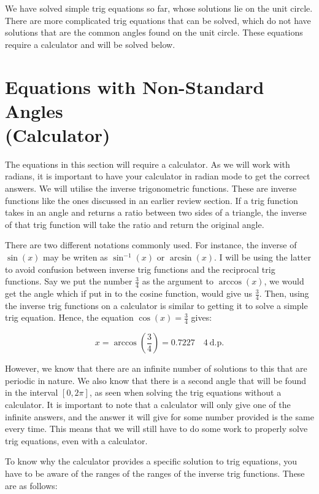 \documentclass[12pt]{article}
\theoremstyle{definition}
\begin{document}
We have solved simple trig equations so far, whose solutions lie on the unit circle.
There are more complicated trig equations that can be solved, which do not have solutions that are the common angles found on the unit circle.
These equations require a calculator and will be solved below.

\section{Equations with Non-Standard Angles \\
  (Calculator)}

The equations in this section will require a calculator.
As we will work with radians, it is important to have your calculator in radian mode to get the correct answers.
We will utilise the inverse trigonometric functions.
These are inverse functions like the ones discussed in an earlier review section.
If a trig function takes in an angle and returns a ratio between two sides of a triangle, the inverse of that trig function will take the ratio and return the original angle.

There are two different notations commonly used.
For instance, the inverse of $\sin(x)$ may be writen as $\sin^{-1}(x)$ or $\arcsin(x)$.
I will be using the latter to avoid confusion between inverse trig functions and the reciprocal trig functions.
Say we put the number $\frac{3}{4}$ as the argument to $\arccos(x)$, we would get the angle which if put in to the cosine function, would give us $\frac{3}{4}$.
Then, using the inverse trig functions on a calculator is similar to getting it to solve a simple trig equation.
Hence, the equation $\cos(x) = \frac{3}{4}$ gives:

\begin{equation}
    x = \arccos\left(\frac{3}{4}\right) = 0.7227 \quad 4~\text{d.p.}
\end{equation}

However, we know that there are an infinite number of solutions to this that are periodic in nature.
We also know that there is a second angle that will be found in the interval $[0, 2\pi]$, as seen when solving the trig equations without a calculator.
It is important to note that a calculator will only give one of the infinite answers, and the answer it will give for some number provided is the same every time.
This means that we will still have to do some work to properly solve trig equations, even with a calculator.

To know why the calculator provides a specific solution to trig equations, you have to be aware of the ranges of the ranges of the inverse trig functions.
These are as follows:
\end{document}
